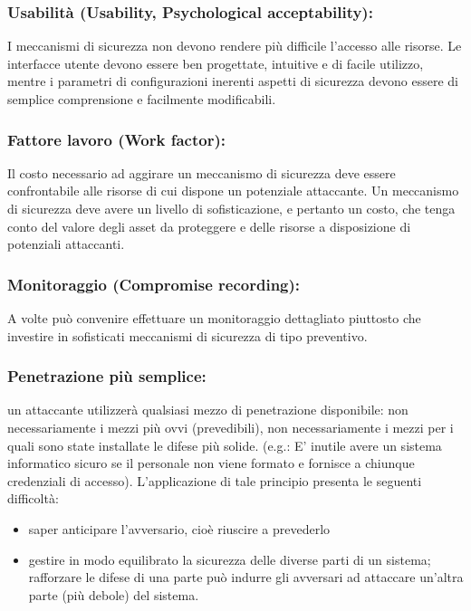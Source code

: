 \subsubsection{Usabilità (Usability, Psychological acceptability):} I meccanismi di sicurezza non devono rendere più difficile l’accesso alle risorse. Le interfacce utente devono essere ben progettate, intuitive e di facile utilizzo, mentre i parametri di configurazioni inerenti aspetti di sicurezza devono essere di semplice comprensione e facilmente modificabili.

\subsubsection{Fattore lavoro (Work factor):} Il costo necessario ad aggirare un meccanismo di sicurezza deve essere confrontabile alle risorse di cui dispone un potenziale attaccante. Un meccanismo di sicurezza deve avere un livello di sofisticazione, e pertanto un costo, che tenga conto del valore degli asset da proteggere e delle risorse a disposizione di potenziali attaccanti.

\subsubsection{Monitoraggio (Compromise recording):} A volte può convenire effettuare un monitoraggio dettagliato piuttosto che investire in sofisticati meccanismi di sicurezza di tipo preventivo.

\subsubsection{Penetrazione più semplice:} un attaccante utilizzerà qualsiasi mezzo di penetrazione disponibile: non necessariamente i mezzi più ovvi (prevedibili), non necessariamente i mezzi per i quali sono state installate le difese più solide. (e.g.: E' inutile avere un sistema informatico sicuro se il personale non viene formato e fornisce a chiunque credenziali di accesso). L’applicazione di tale principio presenta le seguenti difficoltà:
\begin{itemize} 
  \item saper anticipare l’avversario, cioè riuscire a prevederlo
  \item gestire in modo equilibrato la sicurezza delle diverse parti di un sistema; rafforzare le difese di una parte può indurre gli avversari ad attaccare un'altra parte (più debole) del sistema.
\end{itemize}


